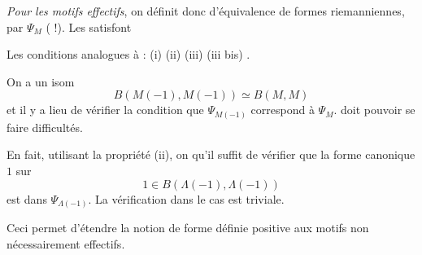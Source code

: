 \documentclass[11pt,a4paper]{article}
\begin{document}
\emph{Pour les motifs effectifs}, on définit donc \struck{\ill{}}
 d'équivalence de formes riemanniennes, \ill{} par
$\Psi_{M}$ (\ill{}  !). Les 
satisfont

Les conditions \struck{\ill{}} analogues à : (i) (ii) (iii) (iii bis)
.

 On a un isom
\[
  B(M(-1), M(-1)) \simeq B(M, M)
\]
et il y a lieu de vérifier la condition que $\Psi_{M(-1)}$ correspond à
$\Psi_{M}$.  doit pouvoir se faire \ill{} difficultés.

En fait, utilisant la propriété (ii), on  
qu'il suffit de vérifier que la forme canonique $1$ sur
\[
  1 \in B(\Lambda(-1), \Lambda(-1))
\]
est dans $\Psi_{\Lambda(-1)}$.  La vérification
dans le cas  \ill{} est triviale.

Ceci permet d'étendre la notion de forme définie positive aux
motifs non nécessairement effectifs.
\end{document}

